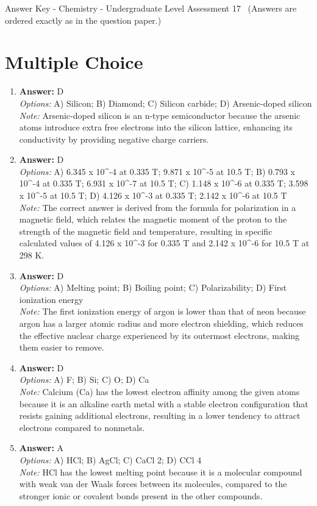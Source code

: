 \documentclass[12pt]{article}
\begin{document}
\begin{center}
Answer Key - Chemistry - Undergraduate Level Assessment 17 \
\small (Answers are ordered exactly as in the question paper.)
\end{center}

\section*{Multiple Choice}
\begin{enumerate}[label=\arabic*.]
\item \textbf{Answer:} D
\\ \textit{Options:} A) Silicon; B) Diamond; C) Silicon carbide; D) Arsenic-doped silicon
\\ \textit{Note:} Arsenic-doped silicon is an n-type semiconductor because the arsenic atoms introduce extra free electrons into the silicon lattice, enhancing its conductivity by providing negative charge carriers.
\item \textbf{Answer:} D
\\ \textit{Options:} A) 6.345 x 10^-4 at 0.335 T; 9.871 x 10^-5 at 10.5 T; B) 0.793 x 10^-4 at 0.335 T; 6.931 x 10^-7 at 10.5 T; C) 1.148 x 10^-6 at 0.335 T; 3.598 x 10^-5 at 10.5 T; D) 4.126 x 10^-3 at 0.335 T; 2.142 x 10^-6 at 10.5 T
\\ \textit{Note:} The correct answer is derived from the formula for polarization in a magnetic field, which relates the magnetic moment of the proton to the strength of the magnetic field and temperature, resulting in specific calculated values of 4.126 x 10^-3 for 0.335 T and 2.142 x 10^-6 for 10.5 T at 298 K.
\item \textbf{Answer:} D
\\ \textit{Options:} A) Melting point; B) Boiling point; C) Polarizability; D) First ionization energy
\\ \textit{Note:} The first ionization energy of argon is lower than that of neon because argon has a larger atomic radius and more electron shielding, which reduces the effective nuclear charge experienced by its outermost electrons, making them easier to remove.
\item \textbf{Answer:} D
\\ \textit{Options:} A) F; B) Si; C) O; D) Ca
\\ \textit{Note:} Calcium (Ca) has the lowest electron affinity among the given atoms because it is an alkaline earth metal with a stable electron configuration that resists gaining additional electrons, resulting in a lower tendency to attract electrons compared to nonmetals.
\item \textbf{Answer:} A
\\ \textit{Options:} A) HCl; B) AgCl; C) CaCl 2; D) CCl 4
\\ \textit{Note:} HCl has the lowest melting point because it is a molecular compound with weak van der Waals forces between its molecules, compared to the stronger ionic or covalent bonds present in the other compounds.
\end{enumerate}
\end{document}
